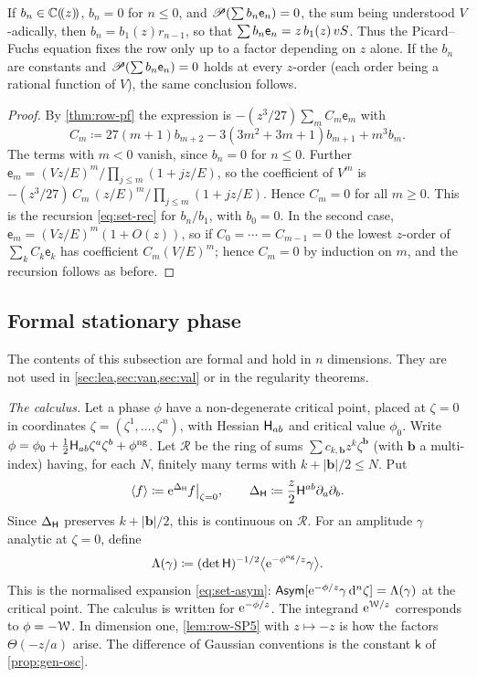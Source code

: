 \begin{cor}
\label{cor:row-unique}
If $b_n\in\mathbb{C}(\!(z)\!)$, $b_n=0$ for $n\leq0$, and $\mathscr{P}(\sum b_n\mathsf{e}_n)=0$, the sum being understood $V$-adically, then $b_n=b_1(z)r_{n-1}$, so that $\sum b_n\mathsf{e}_n=z\,b_1(z)\,vS$. Thus the Picard--Fuchs equation fixes the row only up to a factor depending on $z$ alone. If the $b_n$ are constants and $\mathscr{P}(\sum b_n\mathsf{e}_n)=0$ holds at every $z$-order (each order being a rational function of $V$), the same conclusion follows.
\end{cor}

\begin{proof}
By \cref{thm:row-pf} the expression is $-(z^3/27)\sum_mC_m\mathsf{e}_m$ with
\[
C_m\coloneqq27(m+1)b_{m+2}-3(3m^2+3m+1)b_{m+1}+m^3b_m.
\]
The terms with $m<0$ vanish, since $b_n=0$ for $n\leq0$. Further $\mathsf{e}_m=(Vz/E)^m/\prod_{j\leq m}(1+jz/E)$, so the coefficient of $V^m$ is $-(z^3/27)\,C_m\,(z/E)^m/\prod_{j\leq m}(1+jz/E)$. Hence $C_m=0$ for all $m\geq0$. This is the recursion \eqref{eq:set-rec} for $b_{n}/b_1$, with $b_0=0$. In the second case, $\mathsf{e}_m=(Vz/E)^m(1+O(z))$, so if $C_0=\cdots=C_{m-1}=0$ the lowest $z$-order of $\sum_kC_k\mathsf{e}_k$ has coefficient $C_m(V/E)^m$; hence $C_m=0$ by induction on $m$, and the recursion follows as before.
\end{proof}

\subsection{Formal stationary phase}
\label{sec:row-sp}

The contents of this subsection are formal and hold in $n$ dimensions. They are not used in \cref{sec:lea,sec:van,sec:val} or in the regularity theorems.

\emph{The calculus.} Let a phase $\phi$ have a non-degenerate critical point, placed at $\zeta=0$ in coordinates $\zeta=(\zeta^1,\ldots,\zeta^n)$, with Hessian $\mathsf{H}_{ab}$ and critical value $\phi_0$. Write $\phi=\phi_0+\frac12\mathsf{H}_{ab}\zeta^a\zeta^b+\phi^{\mathrm{ng}}$. Let $\mathscr{R}$ be the ring of sums $\sum c_{k,\mathbf{b}}z^k\zeta^{\mathbf{b}}$ (with $\mathbf{b}$ a multi-index) having, for each $N$, finitely many terms with $k+|\mathbf{b}|/2\leq N$. Put
\[
\langle f\rangle\coloneqq\mathrm{e}^{\Delta_{\mathsf{H}}}f\big|_{\zeta=0},\qquad\Delta_{\mathsf{H}}\coloneqq\frac z2\mathsf{H}^{ab}\partial_a\partial_b.
\]
Since $\Delta_{\mathsf{H}}$ preserves $k+|\mathbf{b}|/2$, this is continuous on $\mathscr{R}$. For an amplitude $\gamma$ analytic at $\zeta=0$, define
\[
\Lambda(\gamma)\coloneqq(\det\mathsf{H})^{-1/2}\big\langle\mathrm{e}^{-\phi^{\mathrm{ng}}/z}\gamma\big\rangle.
\]
This is the normalised expansion \eqref{eq:set-asym}: $\mathsf{Asym}[\mathrm{e}^{-\phi/z}\gamma\,\mathrm{d}^n\zeta]=\Lambda(\gamma)$ at the critical point. The calculus is written for $\mathrm{e}^{-\phi/z}$. The integrand $\mathrm{e}^{\mathcal{W}/z}$ corresponds to $\phi=-\mathcal{W}$. In dimension one, \cref{lem:row-SP5} with $z\mapsto-z$ is how the factors $\Theta(-z/a)$ arise. The difference of Gaussian conventions is the constant $\mathsf{k}$ of \cref{prop:gen-osc}.

